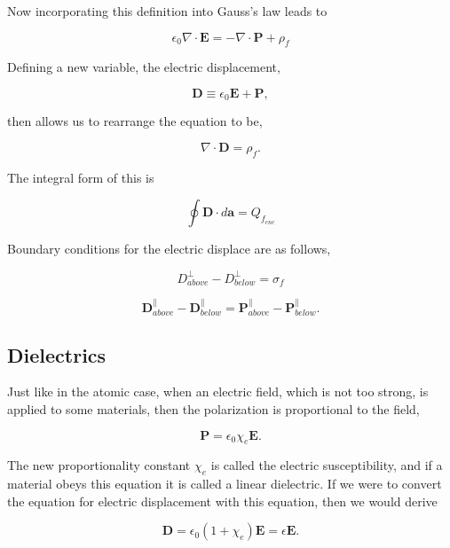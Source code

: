 \documentclass[preprint, review,12pt]{elsarticle}
\def\.{\cdot}
\def\b{\textbf}
\def\={\equiv}
\def\div{\nabla \.}
\begin{document}
Now incorporating this definition into Gauss's law leads to

\begin{equation}
    \epsilon_0 \div \b{E} = - \div \b{P} + \rho_f
\end{equation}

Defining a new variable, the electric displacement,

\begin{equation}
    \b{D} \= \epsilon_0 \b{E} + \b{P},
\end{equation}

then allows us to rearrange the equation to be,

\begin{equation}
    \div \b{D} = \rho_f.
\end{equation}

The integral form of this is

\begin{equation}
    \oint \b{D} \. d\b{a}= Q_{f_{enc}}
\end{equation}

Boundary conditions for the electric displace are as follows,

\begin{equation}
    D_{above}^\bot - D_{below}^\bot = \sigma_f
\end{equation}

\begin{equation}
    \b{D}_{above}^\parallel - \b{D}_{below}^\parallel = \b{P}_{above}^\parallel - \b{P}_{below}^\parallel.
\end{equation}

\subsection{Dielectrics}

Just like in the atomic case, when an electric field, which is not too strong, is applied to some materials, then the polarization is proportional to the field,

\begin{equation}
    \b{P} = \epsilon_0 \chi_e \b{E}.
\end{equation}

The new proportionality constant $\chi_e$ is called the electric susceptibility, and if a material obeys this equation it is called a linear dielectric. If we were to convert the equation for electric displacement with this equation, then we would derive 

\begin{equation}
    \b{D} = \epsilon_0 (1+\chi_e)\b{E} = \epsilon \b{E}.
\end{equation}
\end{document}
